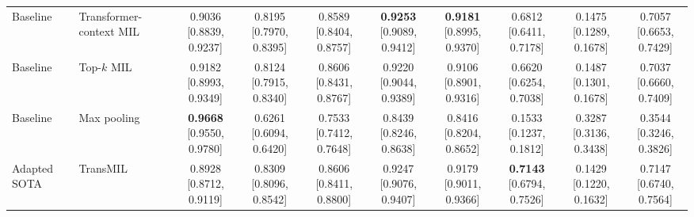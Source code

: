 \documentclass[Afour,sagev,times]{sagej}
\begin{document}
\begin{table}[t]
{\begin{tabular}{ll*{8}{c}}
Baseline & Transformer-context MIL & \shortstack{0.9036\\{[}0.8839, 0.9237{]}} & \shortstack{0.8195\\{[}0.7970, 0.8395{]}} & \shortstack{0.8589\\{[}0.8404, 0.8757{]}} & \shortstack{\textbf{0.9253}\\{[}0.9089, 0.9412{]}} & \shortstack{\textbf{0.9181}\\{[}0.8995, 0.9370{]}} & \shortstack{0.6812\\{[}0.6411, 0.7178{]}} & \shortstack{0.1475\\{[}0.1289, 0.1678{]}} & \shortstack{0.7057\\{[}0.6653, 0.7429{]}} \\
Baseline & Top-$k$ MIL & \shortstack{0.9182\\{[}0.8993, 0.9349{]}} & \shortstack{0.8124\\{[}0.7915, 0.8340{]}} & \shortstack{0.8606\\{[}0.8431, 0.8767{]}} & \shortstack{0.9220\\{[}0.9044, 0.9389{]}} & \shortstack{0.9106\\{[}0.8901, 0.9316{]}} & \shortstack{0.6620\\{[}0.6254, 0.7038{]}} & \shortstack{0.1487\\{[}0.1301, 0.1678{]}} & \shortstack{0.7037\\{[}0.6660, 0.7409{]}} \\
Baseline & Max pooling & \shortstack{\textbf{0.9668}\\{[}0.9550, 0.9780{]}} & \shortstack{0.6261\\{[}0.6094, 0.6420{]}} & \shortstack{0.7533\\{[}0.7412, 0.7648{]}} & \shortstack{0.8439\\{[}0.8246, 0.8638{]}} & \shortstack{0.8416\\{[}0.8204, 0.8652{]}} & \shortstack{0.1533\\{[}0.1237, 0.1812{]}} & \shortstack{0.3287\\{[}0.3136, 0.3438{]}} & \shortstack{0.3544\\{[}0.3246, 0.3826{]}} \\
\midrule
Adapted SOTA & TransMIL & \shortstack{0.8928\\{[}0.8712, 0.9119{]}} & \shortstack{0.8309\\{[}0.8096, 0.8542{]}} & \shortstack{0.8606\\{[}0.8411, 0.8800{]}} & \shortstack{0.9247\\{[}0.9076, 0.9407{]}} & \shortstack{0.9179\\{[}0.9011, 0.9366{]}} & \shortstack{\textbf{0.7143}\\{[}0.6794, 0.7526{]}} & \shortstack{0.1429\\{[}0.1220, 0.1632{]}} & \shortstack{0.7147\\{[}0.6740, 0.7564{]}} \\

\end{tabular}}
\end{table}
\end{document}
